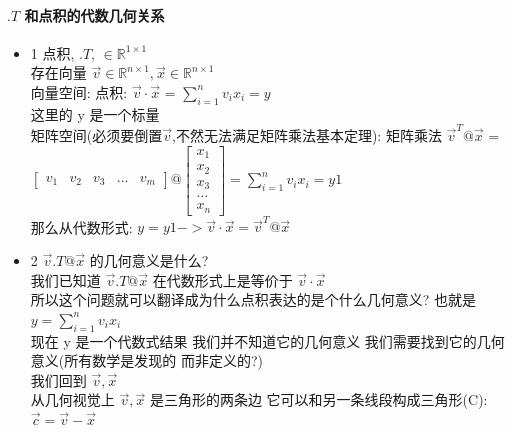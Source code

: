 \documentclass[12pt]{article}
\begin{document}
\paragraph{$.T$ 和点积的代数几何关系}
\begin{flushleft}
    \begin{itemize}
        \item 1 点积, $.T$, $\in \mathbb{R}^{1 \times 1}$ \\
              存在向量 $\vec{v} \in \mathbb{R}^{n \times 1}, \vec{x}  \in \mathbb{R}^{n \times 1}$ \\
              向量空间:
              点积: $\vec{v} \cdot \vec{x}$ = $\sum_{i = 1}^{n} v_{i}x_{i} = y$ \\
              这里的 y 是一个标量 \\
              矩阵空间(必须要倒置$\vec{v}$,不然无法满足矩阵乘法基本定理):
              矩阵乘法 $\vec{v}^{T} @ \vec{x}$ = $\begin{bmatrix}
                      v_{1} & v_{2} & v_{3} & \dots & v_{m}
                  \end{bmatrix}@ \begin{bmatrix}
                      x_{1} \\
                      x_{2} \\
                      x_{3} \\
                      \dots \\
                      x_{n}
                  \end{bmatrix} = \sum_{i = 1}^{n}v_{i}x_{i} = y1 $\\
              那么从代数形式: $y = y1 -> \vec{v} \cdot \vec{x} = \vec{v}^{T} @ \vec{x} $
        \item 2  $\vec{v}.T @ \vec{x}$ 的几何意义是什么? \\
              我们已知道 $\vec{v}.T @ \vec{x}$ 在代数形式上是等价于  $\vec{v} \cdot \vec{x}$ \\
              所以这个问题就可以翻译成为什么点积表达的是个什么几何意义? 也就是 $y = \sum_{i = 1}^{n}v_{i}x_{i}$ \\
              现在 y 是一个代数式结果 我们并不知道它的几何意义 我们需要找到它的几何意义(所有数学是发现的 而非定义的?) \\
              我们回到 $\vec{v}, \vec{x}$ \\
              从几何视觉上 $\vec{v}, \vec{x}$ 是三角形的两条边 它可以和另一条线段构成三角形(C):\\
              $\vec{c} = \vec{v} - \vec{x}$ \\

\end{itemize}
\end{flushleft}
\end{document}
